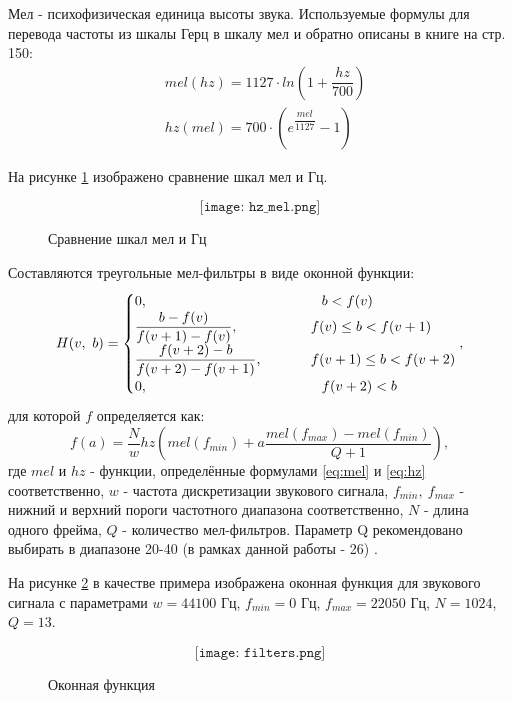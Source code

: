 Мел - психофизическая единица высоты звука. Используемые формулы для перевода частоты из шкалы Герц в шкалу 
мел и обратно описаны в книге \cite{Mel} на стр. 150:
\begin{align}
	\label{eq:mel}
	&mel(hz) = 1127 \cdot ln(1 + \dfrac{hz}{700})\\
	\label{eq:hz}
	&hz(mel) = 700 \cdot (e^{\dfrac{mel}{1127}}-1)
\end{align}

На рисунке \ref{fig:hz_mel} изображено сравнение шкал мел и Гц.

\begin{figure}[H]
	\[\texttt{[image: hz\_mel.png]}\]
	\caption{Сравнение шкал мел и Гц}
	\label{fig:hz_mel}
\end{figure}

Составляются треугольные мел-фильтры в виде оконной функции:
\begin{equation}
	H(v,~b)=
	\begin{cases}
		0, 										     & \Phantom \phantom{-}    b < f(v)\\
		\dfrac{b-f(v)}{f(v+1)-f(v)},   & \Phantom f(v) \leq b < f(v+1)\\
		\dfrac{f(v+2)-b}{f(v+2)-f(v+1)}, & \Phantom f(v+1) \leq b < f(v+2)\\
		0,                                           & \Phantom \phantom{-}   f(v+2) < b\\
	\end{cases}
,
\end{equation}
для которой $f$ определяется как:
\begin{equation}
	f(a)=\dfrac{N}{w} hz(mel(f_{min})+a \dfrac{mel(f_{max})-mel(f_{min})}{Q+1}),
\end{equation}
где $mel$ и $hz$ - функции, определённые формулами \eqref{eq:mel} и \eqref{eq:hz} соответственно, $w$ - частота дискретизации звукового сигнала, $f_{min},~f_{max}$ - нижний и верхний пороги частотного диапазона соответственно, $N$ - длина одного фрейма, $Q$ - количество мел-фильтров. Параметр Q рекомендовано выбирать в диапазоне 20-40 (в рамках данной работы - 26) \cite{MFCC}.

На рисунке \ref{fig:filters} в качестве примера изображена оконная функция для звукового сигнала с параметрами $w=44100$ Гц, $f_{min}=0$ Гц, $f_{max}=22050$ Гц, $N=1024$, $Q=13$.

\begin{figure}[H]
	\[\texttt{[image: filters.png]}\]
	\caption{Оконная функция}
	\label{fig:filters}
\end{figure}

